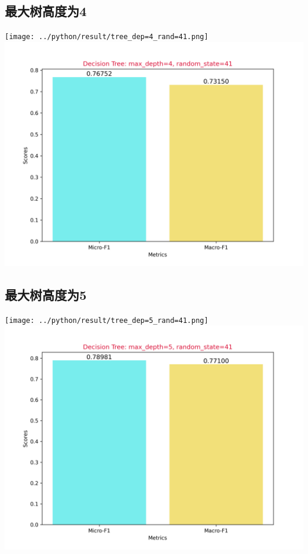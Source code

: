 \documentclass{article}
\begin{document}
\subsection{最大树高度为4}
\texttt{[image: ../python/result/tree\_dep=4\_rand=41.png]}\\
\includegraphics[width=1.0\textwidth]{../python/result/score_dep=4_rand=41.png}\\
\subsection{最大树高度为5}
\texttt{[image: ../python/result/tree\_dep=5\_rand=41.png]}\\
\includegraphics[width=1.0\textwidth]{../python/result/score_dep=5_rand=41.png}\\
\end{document}
